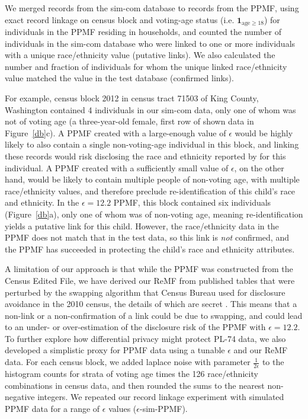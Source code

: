 \documentclass{article}
\begin{document}
We merged records from the sim-com database to records from the PPMF, using exact record linkage on census block and voting-age status (i.e. $\mathbf{1}_{\mathrm{age} \geq 18}$) for individuals in the PPMF residing in households, and counted the number of individuals in the sim-com database who were linked to one or more individuals with a unique race/ethnicity value (putative links).  We also calculated the number and fraction of individuals for whom the unique linked race/ethnicity value matched the value in the test database (confirmed links).

For example, census block 2012 in census tract 71503 of King County, Washington contained 4 individuals in our sim-com data, only one of whom was not of voting age (a three-year-old female, first row of shown data in Figure~\ref{db}c).  A PPMF created with a large-enough value of $\epsilon$ would be highly likely to also contain a single non-voting-age individual in this block, and linking these records would risk disclosing the race and ethnicity reported by for this individual. A PPMF created with a sufficiently small value of $\epsilon$, on the other hand, would be likely to contain multiple people of non-voting age, with multiple race/ethnicity values, and therefore preclude re-identification of this child's race and ethnicity. In the $\epsilon=12.2$ PPMF, this block contained six individuals (Figure~\ref{db}a), only one of whom was of non-voting age, meaning re-identification yields a putative link for this child. However, the race/ethnicity data in the PPMF does not match that in the test data, so this link is \emph{not} confirmed, and the PPMF has succeeded in protecting the child's race and ethnicity attributes.

A limitation of our approach is that while the PPMF was constructed from the Census Edited File, we have derived our ReMF from published tables that were perturbed by the swapping algorithm that Census Bureau used for disclosure avoidance in the 2010 census, the details of which are secret \cite{mckenna2018disclosure}.   This means that a non-link or a non-confirmation of a link could be due to swapping, and could lead to an under- or over-estimation of the disclosure risk of the PPMF with $\epsilon=12.2$.  To further explore how differential privacy might protect PL-74 data, we also developed a simplistic proxy for PPMF data using a tunable $\epsilon$ and our ReMF data.  For each census block, we added laplace noise with parameter $\frac{1}{2\epsilon}$ to the histogram counts for strata of voting age times the 126 race/ethnicity combinations in census data, and then rounded the sums to the nearest non-negative integers.  We repeated our record linkage experiment with simulated PPMF data for a range of $\epsilon$ values ($\epsilon$-sim-PPMF).
\end{document}
